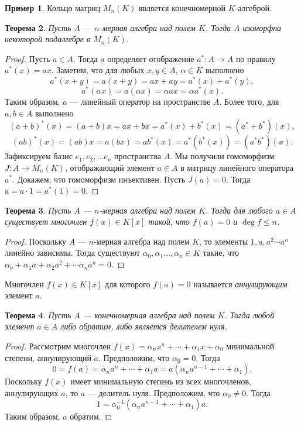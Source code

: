 \documentclass[12pt, titlepage, oneside]{amsbook}
\newtheorem{theorem}{Теорема}[chapter]
\theoremstyle{definition}
\newtheorem{example}[theorem]{Пример}
\theoremstyle{remark}
\begin{document}
\begin{example}
	Кольцо матриц $M_n(K)$ является конечномерной $K$-алгеброй.
\end{example}

\begin{theorem}
	\label{Algebra1} Пусть $A$ --- $n$-мерная алгебра над полем $K$. Тогда $A$ изоморфна некоторой подалгебре в $M_n(K)$.
\end{theorem}

\begin{proof}
	Пусть $a\in A$. Тогда $a$ определяет отображение $a^*\colon A\rightarrow A$ по правилу $a^*(x)=ax$. Заметим, что для любых $x,y\in A$, $\alpha\in K$ выполнено $$a^*(x+y)=a(x+y)=ax+ay=a^*(x)+a^*(y),$$ $$a^*(\alpha x)=a(\alpha x)=\alpha ax=\alpha a^*(x).$$ Таким образом, $a$ --- линейный оператор на пространстве $A$. Более того, для $a,b\in A$ выполнено $$(a+b)^*(x)=(a+b)x=ax+bx=a^*(x)+b^*(x)=(a^*+b^*)(x),$$ $$(ab)^*(x)=(ab)x=a(bx)=ab^*(x)=a^*(b^*(x))=(a^*b^*)(x).$$ Зафиксируем базис $e_1,e_2,\ldots e_n$ пространства $A$. Мы получили гомоморфизм $J\colon A\rightarrow M_n(K)$, отображающий элемент $a\in A$ в матрицу линейного оператора $a^*$. Докажем, что гомоморфизм инъективен. Пусть $J(a)=0$. Тогда $a=a\cdot 1=a^*(1)=0.$
\end{proof}

\begin{theorem}
	\label{Algebra2} Пусть $A$ --- $n$-мерная алгебра над полем $K$. Тогда для любого $a\in A$ существует многочлен $f(x)\in K[x]$ такой, что $f(a)=0$ и $\deg f\leq n$.
\end{theorem}

\begin{proof}
	Поскольку $A$ --- $n$-мерная алгебра над полем $K$, то элементы $1,a,a^2\cdots a^n$ линейно зависимы. Тогда существуют  $\alpha_0,\alpha_1\ldots,\alpha_n\in K$ такие, что $\alpha_0+\alpha_1 a+\alpha_2 a^2+\cdots\alpha_n a^n=0.$
\end{proof}

Многочлен $f(x)\in K[x]$ для которого $f(a)=0$ называется \emph{аннулирующим} элемент $a$.

\begin{theorem}
	\label{Algebra3} Пусть $A$ --- конечномерная алгебра над полем $K$. Тогда любой элемент $a\in A$ либо обратим, либо является делителем нуля.
\end{theorem}

\begin{proof}
	Рассмотрим многочлен $f(x)=\alpha_n x^n+\cdots+\alpha_1 x+\alpha_0$ минимальной степени, аннулирующий $a$. Предположим, что $\alpha_0=0$. Тогда $$0=f(a)=\alpha_n a^n+\cdots+\alpha_1 a=a(\alpha_n a^{n-1}+\cdots+\alpha_1).$$ Поскольку $f(x)$ имеет минимальную степень из всех многочленов, аннулирующих $a$, то $a$ --- делитель нуля. Предположим, что $\alpha_0\neq 0$. Тогда $$1=\alpha_0^{-1}(\alpha_n a^{n-1}+\cdots+\alpha_1)a.$$ Таким образом, $a$ обратим.
\end{proof}
\end{document}
